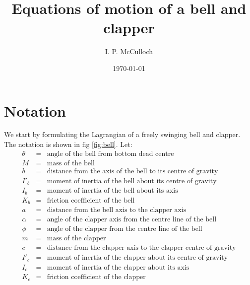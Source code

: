 \documentclass{article}
\begin{document}
\newcommand{\deriv}[2]{\frac{\mathrm{d} #1}{\mathrm{d} #2}}
\newcommand{\pderiv}[2]{\frac{\partial #1}{\partial #2}}
\newcommand{\refeq}[1]{Eq.~(\ref{#1})}
\newcommand{\refeqtwo}[2]{Eq.~(\ref{#1},\ref{#2})}
\newcommand{\reffig}[1]{Fig.~(\ref{#1})}

\title{Equations of motion of a bell and clapper}

\author{I. P. McCulloch}
\date{\today}

\maketitle

\section{Notation}

We start by formulating the Lagrangian of a freely swinging bell and clapper. 
The notation is shown in fig \ref{fig:bell}. Let:
\begin{equation}
\begin{array}{rcl}
\theta &=& \mbox{angle of the bell from bottom dead centre} \\
M &=& \mbox{mass of the bell}\\
b &=& \mbox{distance from the axis of the bell to its centre of gravity} \\
I'_b &=& \mbox{moment of inertia of the bell about its centre of gravity} \\
I_b &=& \mbox{moment of inertia of the bell about its axis}\\
K_b &=& \mbox{friction coefficient of the bell}\\
a &=& \mbox{distance from the bell axis to the clapper axis} \\
\alpha &=& \mbox{angle of the clapper axis from the centre line of the bell}\\
\phi &=& \mbox{angle of the clapper from the centre line of the bell}\\
m &=& \mbox{mass of the clapper}\\
c &=& \mbox{distance from the clapper axis to the clapper centre of gravity}\\
I'_c &=& \mbox{moment of inertia of the clapper about its centre of gravity}\\
I_c &=& \mbox{moment of inertia of the clapper about its axis}\\
K_c &=& \mbox{friction coefficient of the clapper}
\end{array}
\end{equation}
\end{document}
